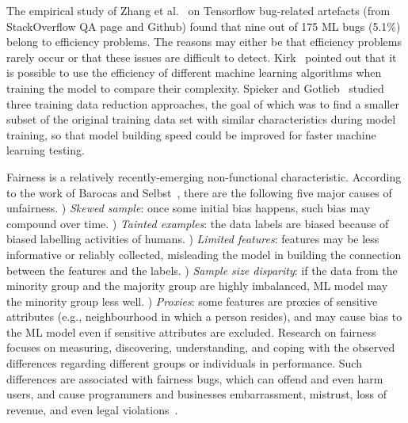 \label{sec:efficiency} 
The empirical study of Zhang et al.~ on Tensorflow bug-related artefacts (from StackOverflow QA page and Github) found that nine out of 175 ML bugs (5.1\%) belong to efficiency problems.
The reasons may either be that efficiency problems rarely occur or that these issues are difficult to detect.
Kirk~ pointed out that it is possible to use the efficiency of different machine learning algorithms when training the model to compare their complexity.
Spieker and Gotlieb~ studied three training data reduction approaches, the goal of which was to find a smaller subset of the original training data set with similar characteristics during model training, so that model building speed could be improved for faster machine learning testing.

\label{sec:fairness}
Fairness is a relatively recently-emerging non-functional characteristic. 
According to the work of Barocas and Selbst~, there are the following five major causes of unfairness.
) \emph{Skewed sample}: once some initial bias happens, such bias may compound over time.
) \emph{Tainted examples}: the data labels are biased because of biased labelling activities of humans.
) \emph{Limited features}: features may be less informative or reliably collected, misleading the model in building the connection between the features and the labels.
) \emph{Sample size disparity}: if the data from the minority group and the majority group are highly imbalanced, ML model may the minority group less well.
) \emph{Proxies}: some features are proxies of sensitive attributes (e.g., neighbourhood in which a person resides), and may cause bias to the ML model even if sensitive attributes are excluded.
Research on fairness focuses on measuring, discovering, understanding, and coping with the observed differences regarding different groups or individuals in performance.
Such differences are associated with fairness bugs, which can offend and even harm users, and cause programmers and businesses embarrassment, mistrust, loss of revenue, and even legal violations~.

